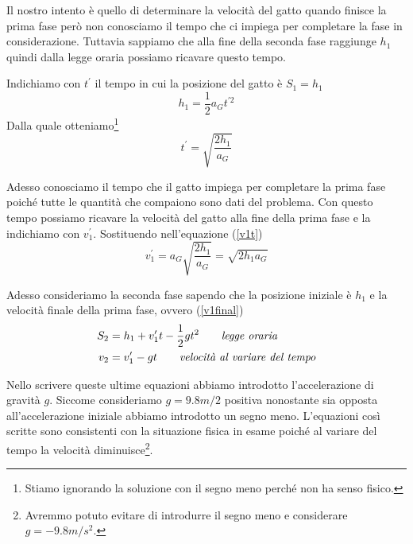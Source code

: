 \documentclass{article}
\begin{document}
Il nostro intento è quello di determinare la velocità del gatto quando finisce la prima fase però non conosciamo il tempo che ci impiega per completare la fase in considerazione. Tuttavia sappiamo che alla fine della seconda fase raggiunge $h_1$ quindi dalla legge oraria possiamo ricavare questo tempo.

Indichiamo con $t^\prime$ il tempo in cui la posizione del gatto è $S_1 = h_1$
\begin{equation}
  h_1 = \frac{1}{2}a_G t^{\prime 2}
\end{equation}
Dalla quale otteniamo\footnote{Stiamo ignorando la soluzione con il segno meno perché non ha senso fisico.}
\begin{equation}
  t^\prime = \sqrt{\frac{2h_1}{a_G}}
\end{equation}

Adesso conosciamo il tempo che il gatto impiega per completare la prima fase poiché tutte le quantità che compaiono sono dati del problema. Con questo tempo possiamo ricavare la velocità del gatto alla fine della prima fase e la indichiamo con $v^\prime_1$. Sostituendo nell'equazione (\ref{v1t})
\begin{equation}\label{v1final}
  v^\prime_1 = a_G \sqrt{\frac{2h_1}{a_G}} = \sqrt{2h_1 a_G}
\end{equation}

Adesso consideriamo la seconda fase sapendo che la posizione iniziale è $h_1$ e la velocità finale della prima fase, ovvero (\ref{v1final})
\begin{align}
  S_2 &= h_1 + v^\prime_1 t - \frac{1}{2}g t^2 \qquad\text{\textit{legge oraria}} \\
  v_2 &=v^\prime_1 - g t \qquad\text{\textit{velocità al variare del tempo}} \label{v2t}
\end{align}

Nello scrivere queste ultime equazioni abbiamo introdotto l'accelerazione di gravità $g$. Siccome consideriamo $g=9.8m/2$ positiva nonostante sia opposta all'accelerazione iniziale abbiamo introdotto un segno meno. L'equazioni così scritte sono consistenti con la situazione fisica in esame poiché al variare del tempo la velocità diminuisce\footnote{Avremmo potuto evitare di introdurre il segno meno e considerare $g=-9.8m/s^2$.}. 
\end{document}
